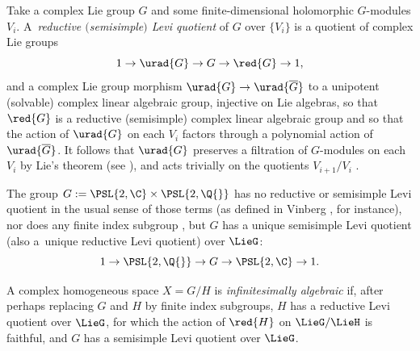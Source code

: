 Take a complex Lie group $G$ and some finite-dimensional holomorphic $G$-modules $V_i$.
A~\emph{reductive $($semisimple$)$ Levi quotient} of $G$ over $\{V_i\}$ is a quotient of complex Lie groups
\[
1 \to \urad{G} \to G \to \red{G} \to 1,
\]
and a complex Lie group morphism $\urad{G} \to \urad{\overline{G}}$ to a unipotent (solvable) complex
linear algebraic group, injective on Lie algebras, so that $\red{G}$ is a reductive (semisimple) complex
linear algebraic group and so that the action of $\urad{G}$ on each $V_i$ factors through a polynomial
action of $\urad{\overline{G}}$.
It follows that $\urad{G}$ preserves a filtration of $G$-modules on each $V_i$ by Lie's theorem
(see \cite[Theorem~3]{Serre:2001}), and acts trivially on the quotients $V_{i+1}/V_i$
\cite[Section 4.8]{Borel:1991}.
\begin{Example}

The group $G := \PSL{2,\C} \times \PSL{2,\Q{}}$ has no reductive or semisimple Levi quotient in the
usual sense of those terms (as defined in Vinberg \cite[p.~20]{Vinberg:1994}, for instance), nor does any finite index
subgroup \cite[Theorem 6.14]{Jacobson:1985}, but $G$ has a unique semisimple Levi quotient (also a~unique reductive Levi quotient) over $\LieG$:
\[
1 \to \PSL{2,\Q{}} \to G \to \PSL{2,\C} \to 1.
\]
\end{Example}
A complex homogeneous space $X=G/H$ is \emph{infinitesimally algebraic} if, after perhaps replacing $G$ and $H$ by finite index subgroups, $H$ has a reductive Levi quotient over $\LieG$, for which the action of $\red{H}$ on $\LieG/\LieH$ is faithful, and $G$ has a semisimple Levi quotient over $\LieG$.
